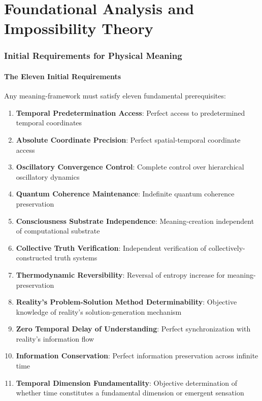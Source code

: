 \documentclass[12pt,a4paper]{article}
\theoremstyle{remark}
\begin{document}
\part{Foundational Analysis and Impossibility Theory}

\section{Initial Requirements for Physical Meaning}

\subsection{The Eleven Initial Requirements}

Any meaning-framework must satisfy eleven fundamental prerequisites:

\begin{enumerate}
\item \textbf{Temporal Predetermination Access}: Perfect access to predetermined temporal coordinates
\item \textbf{Absolute Coordinate Precision}: Perfect spatial-temporal coordinate access
\item \textbf{Oscillatory Convergence Control}: Complete control over hierarchical oscillatory dynamics
\item \textbf{Quantum Coherence Maintenance}: Indefinite quantum coherence preservation
\item \textbf{Consciousness Substrate Independence}: Meaning-creation independent of computational substrate
\item \textbf{Collective Truth Verification}: Independent verification of collectively-constructed truth systems
\item \textbf{Thermodynamic Reversibility}: Reversal of entropy increase for meaning-preservation
\item \textbf{Reality's Problem-Solution Method Determinability}: Objective knowledge of reality's solution-generation mechanism
\item \textbf{Zero Temporal Delay of Understanding}: Perfect synchronization with reality's information flow
\item \textbf{Information Conservation}: Perfect information preservation across infinite time
\item \textbf{Temporal Dimension Fundamentality}: Objective determination of whether time constitutes a fundamental dimension or emergent sensation
\end{enumerate}
\end{document}
